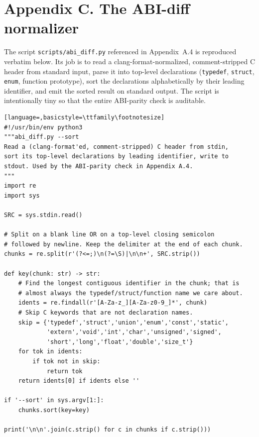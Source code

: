 \documentclass[12pt]{article}
\theoremstyle{definition}
\theoremstyle{remark}
\begin{document}
{}
\label{app:abidiff}
\section*{Appendix C. The ABI-diff normalizer}

The script \texttt{scripts/abi\_diff.py} referenced in
Appendix~A.4 is reproduced verbatim below. Its job is to read a
clang-format-normalized, comment-stripped C header from standard
input, parse it into top-level declarations (\texttt{typedef},
\texttt{struct}, \texttt{enum}, function prototype), sort the
declarations alphabetically by their leading identifier, and emit
the sorted result on standard output. The script is intentionally
tiny so that the entire ABI-parity check is auditable.

\begin{lstlisting}[language=,basicstyle=\ttfamily\footnotesize]
#!/usr/bin/env python3
"""abi_diff.py --sort
Read a (clang-format'ed, comment-stripped) C header from stdin,
sort its top-level declarations by leading identifier, write to
stdout. Used by the ABI-parity check in Appendix A.4.
"""
import re
import sys

SRC = sys.stdin.read()

# Split on a blank line OR on a top-level closing semicolon
# followed by newline. Keep the delimiter at the end of each chunk.
chunks = re.split(r'(?<=;)\n(?=\S)|\n\n+', SRC.strip())

def key(chunk: str) -> str:
    # Find the longest contiguous identifier in the chunk; that is
    # almost always the typedef/struct/function name we care about.
    idents = re.findall(r'[A-Za-z_][A-Za-z0-9_]*', chunk)
    # Skip C keywords that are not declaration names.
    skip = {'typedef','struct','union','enum','const','static',
            'extern','void','int','char','unsigned','signed',
            'short','long','float','double','size_t'}
    for tok in idents:
        if tok not in skip:
            return tok
    return idents[0] if idents else ''

if '--sort' in sys.argv[1:]:
    chunks.sort(key=key)

print('\n\n'.join(c.strip() for c in chunks if c.strip()))
\end{lstlisting}
\end{document}
